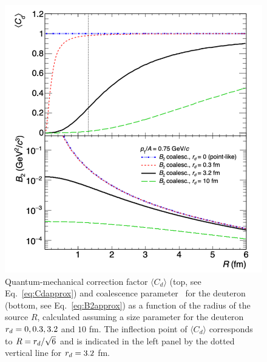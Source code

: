 \documentclass[%
 reprint,
 amsmath,amssymb,
 aps,
]{revtex4-1}
\begin{document}
\begin{figure}[hb]
\begin{center}
\includegraphics[width=\columnwidth]{theory_coalescence_Cd_B2_vert.png}
\caption{{Quantum-mechanical correction factor $\langle C_{d} \rangle$ (top, see Eq.~\ref{eq:Cdapprox}) and coalescence parameter \btwo~for the deuteron (bottom, see Eq.~\ref{eq:B2approx}) as a function of the radius of the source $R$, calculated assuming a size parameter for the deuteron $r_{d} = 0, 0.3, 3.2$ and $10$ fm. The inflection point of $\langle C_{d} \rangle$ corresponds to $R = r_{d}/\sqrt{6}$ and is indicated in the left panel by the dotted vertical line for $r_{d} = 3.2$ fm.}}
\label{fig:radiusDependence}
\end{center}
\end{figure}   
\end{document}
